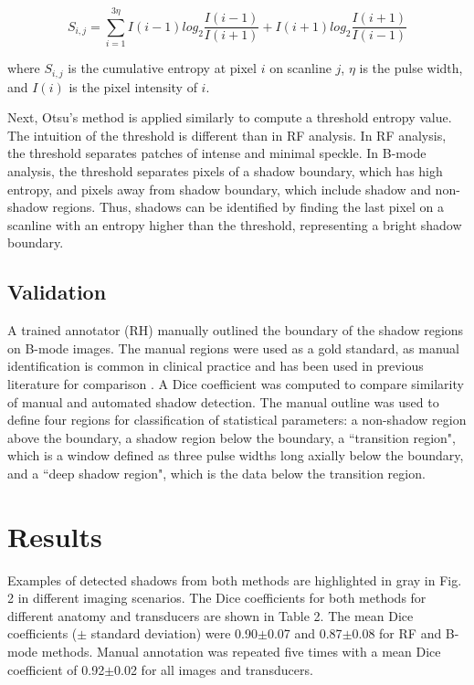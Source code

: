 \documentclass[preprint,5p,authoryear]{elsarticle}
\begin{document}
\begin{equation}
S_{i,j} = \sum_{i=1}^{3\eta}I(i-1)log_{2}\frac{I(i-1)}{I(i+1)}+I(i+1)log_{2}\frac{I(i+1)}{I(i-1)}
\end{equation}

where $S_{i,j}$ is the cumulative entropy at pixel $i$ on scanline $j$, $\eta$ is the pulse width, and $I(i)$ is the pixel intensity of $i$.

Next, Otsu's method is applied similarly to compute a threshold entropy value. The intuition of the threshold is different than in RF analysis. In RF analysis, the threshold separates patches of intense and minimal speckle. In B-mode analysis, the threshold separates pixels of a shadow boundary, which has high entropy, and pixels away from shadow boundary, which include shadow and non-shadow regions. Thus, shadows can be identified by finding the last pixel on a scanline with an entropy higher than the threshold, representing a bright shadow boundary.


\subsection*{Validation}

A trained annotator (RH) manually outlined the boundary of the shadow regions on B-mode images. The manual regions were used as a gold standard, as manual identification is common in clinical practice and has been used in previous literature for comparison \citep{Hellier2010}. A Dice coefficient was computed to compare similarity of manual and automated shadow detection. The manual outline was used to define four regions for classification of statistical parameters: a non-shadow region above the boundary, a shadow region below the boundary, a ``transition region", which is a window defined as three pulse widths long axially below the boundary, and a ``deep shadow region", which is the data below the transition region.
%
\section*{Results}
\label{Results}
Examples of detected shadows from both methods are highlighted in gray in Fig. 2 in different imaging scenarios. The Dice coefficients for both methods for different anatomy and transducers are shown in Table 2. The mean Dice coefficients ($\pm$ standard deviation) were 0.90$\pm$0.07 and 0.87$\pm$0.08 for RF and B-mode methods. Manual annotation was repeated five times with a mean Dice coefficient of 0.92$\pm$0.02 for all images and transducers.
\end{document}
